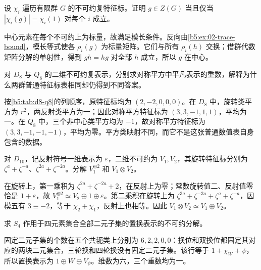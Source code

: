 \begin{exercise}\label{b5:ex:02-center-from-table}
	设 \(\chi_i\) 遍历有限群 \(G\) 的不可约复特征标。证明 \(g\in Z(G)\) 当且仅当 \(|\chi_i(g)|=\chi_i(1)\) 对每个 \(i\) 成立。
\end{exercise}
\begin{solution}
	中心元素在每个不可约上为标量，故满足模长条件。反向由\cref{b5:ex:02-trace-bound}，模长等式使各 \(\rho_i(g)\) 为标量矩阵。它们与所有 \(\rho_i(h)\) 交换；借群代数矩阵分解的单射性，得到 \(gh=hg\) 对全部 \(h\) 成立，所以 \(g\) 在中心。
\end{solution}

\begin{exercise}\label{b5:ex:02-same-table-symmetric-square}
	对 \(D_8\) 与 \(Q_8\) 的二维不可约复表示，分别求对称平方中平凡表示的重数，解释为什么两群普通特征标表相同却仍得到不同答案。
\end{exercise}
\begin{solution}
	按\cref{b5:tab:d8-q8}的列顺序，原特征标均为 \((2,-2,0,0,0)\)。在 \(D_8\) 中，旋转类平方为 \(r^2\)，两反射类平方为一；因此对称平方特征标为 \((3,3,-1,1,1)\)，平均为一。在 \(Q_8\) 中，三个非中心类平方均为 \(-1\)，故对称平方特征标为 \((3,3,-1,-1,-1)\)，平均为零。平方类映射不同，而它不是这张普通数值表自身包含的数据。
\end{solution}

\begin{exercise}\label{b5:ex:02-d10-tensors}
	对 \(D_{10}\)，记反射符号一维表示为 \(\varepsilon\)，二维不可约为 \(V_1,V_2\)，其旋转特征标分别为 \(\zeta^a+\zeta^{-a}\)、\(\zeta^{2a}+\zeta^{-2a}\)。分解 \(V_1^{\otimes2}\) 和 \(V_1\otimes V_2\)。
\end{exercise}
\begin{solution}
	在旋转上，第一乘积为 \(\zeta^{2a}+\zeta^{-2a}+2\)，在反射上为零；常数旋转值二、反射值零恰是 \(1+\varepsilon\)，故 \(V_1^{\otimes2}\simeq V_2\oplus1\oplus\varepsilon\)。第二乘积在旋转上为 \(\zeta^{3a}+\zeta^{-3a}+\zeta^a+\zeta^{-a}\)，因模五有 \(3\equiv-2\)，等于 \(\chi_2+\chi_1\)，反射上也相等。因此 \(V_1\otimes V_2\simeq V_1\oplus V_2\)。
\end{solution}

\begin{exercise}\label{b5:ex:02-s4-two-subsets}
	求 \(S_4\) 作用于四元素集合全部二元子集的置换表示的不可约分解。
\end{exercise}
\begin{solution}
	固定二元子集的个数在五个共轭类上分别为 \(6,2,2,0,0\)：换位和双换位都固定其对应的两块二元集合，三轮换和四轮换没有固定二元子集。该行等于 \(1+\chi_W+\psi\)，所以置换表示为 \(1\oplus W\oplus V_\psi\)。维数为六，三个重数均为一。
\end{solution}

